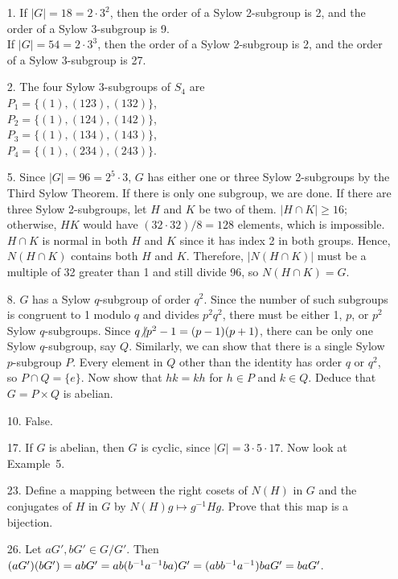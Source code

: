 {\small
\begin{itemize}
 
\bf\item[1.]\rm
If $|G| = 18 = 2 \cdot 3^2$, then the order of a Sylow 2-subgroup is 2,
and the order of a Sylow 3-subgroup is 9. \\
If $|G| = 54 = 2 \cdot 3^3$, then the order of a Sylow 2-subgroup is 2,
and the order of a Sylow 3-subgroup is 27. 
 
 
\bf\item[2.]\rm
The four Sylow 3-subgroups of $S_4$ are \\
$P_1 = \{ (1), (123), (132) \}$,\\
$P_2 = \{ (1), (124), (142) \}$,\\
$P_3 = \{ (1), (134), (143) \}$,\\
$P_4 = \{ (1), (234), (243) \}$.
 
 
\bf\item[5.]\rm
Since $|G| = 96 = 2^5 \cdot 3$, $G$ has either one or three Sylow
2-subgroups by the Third Sylow Theorem. If there is only one subgroup,
we are done. If there are three Sylow 2-subgroups, let $H$ and $K$ be two
of them. $|H \cap K| \geq 16$; otherwise, $HK$ would have $(32 \cdot
32)/8 = 128$ elements, which is impossible. $H \cap K$ is normal in
both $H$ and $K$ since it has index 2 in both groups. Hence, $N(H \cap
K)$ contains both $H$ and $K$. Therefore, $|N(H \cap K)|$ must be a
multiple of 32 greater than 1 and still divide 96, so $N( H \cap K)
= G$. 
 
 
\bf\item[8.]\rm
$G$ has a Sylow $q$-subgroup of order $q^2$. Since the number of such
subgroups is congruent to 1 modulo $q$ and divides $p^2 q^2$, there
must be either 1, $p$, or $p^2$ Sylow $q$-subgroups. 
Since $q {\not{\mid}}
p^2 -1 = (p-1)(p + 1)$, 
there can be only one Sylow $q$-subgroup, say
$Q$. Similarly, we can show that there is a single Sylow $p$-subgroup
$P$. Every element in $Q$ other than the identity has order $q$ or
$q^2$, so $P \cap Q = \{ e \}$. Now show that $hk = kh$ for $h \in P$
and $k \in Q$. Deduce that $G = P \times Q$ is abelian.
 
 
\bf\item[10.]\rm
False.
 
 
\bf\item[17.]\rm
If $G$ is abelian, then $G$ is cyclic, since $|G| = 3 \cdot 5 \cdot
17$. Now look at Example~5.
 
 
\bf\item[23.]\rm
Define a mapping between the right cosets of $N(H)$ in $G$ and the
conjugates of $H$ in $G$ by $N(H) g \mapsto g^{-1} H g$. Prove that
this map is a bijection.
 
 
\bf\item[26.]\rm
Let $a G', b G' \in G/G'$. Then $(a G')( b G') = ab G' =
ab(b^{-1}a^{-1}ba) G' = \\ (abb^{-1}a^{-1})ba G' =  ba G'$.
 
 
 
\end{itemize}
}
 
